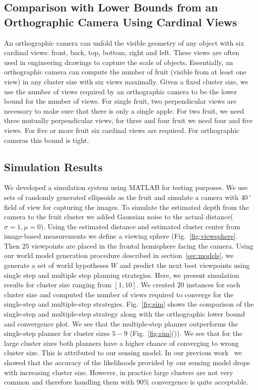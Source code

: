 \subsection{Comparison with Lower Bounds from an Orthographic Camera Using Cardinal Views}\label{subsec:lowerbound}
An orthographic camera can unfold the visible geometry of any object with six cardinal views: front, back, top, bottom, right and left. These views are often used in engineering drawings to capture the scale of objects. Essentially, an orthographic camera can compute the number of fruit (visible from at least one view) in any cluster size with six views maximally. Given a fixed cluster size, we use the number of views required by an orthographic camera to be the lower bound for the number of views. For single fruit, two perpendicular views are necessary to make sure that there is only a single apple. For two fruit, we need three mutually perpendicular views, for three and four fruit we need four and five views. For five or more fruit six cardinal views are required. For orthographic cameras this bound is tight.
\subsection{Simulation Results }\label{subsec:simulation}
We developed a simulation system using MATLAB for testing purposes. We use sets of randomly generated ellipsoids as the fruit and simulate a camera with $40\,^{\circ}$ field of view for capturing the images. To simulate the estimated depth from the camera to the fruit cluster we added Gaussian noise to the actual distance($\sigma = 1, \mu = 0$). Using the estimated distance and estimated cluster center from image-based measurements we define a viewing sphere (Fig.~\ref{fig:viewsphere}. Then $25$ viewpoints are placed in the frontal hemisphere facing the camera. Using our world model generation procedure described in section~\ref{sec:models}, we generate a set of world hypotheses $W$ and predict the next best viewpoints using single step and multiple step planning strategies. Here, we present simulation results for cluster size ranging from $[1,10]$. We created $20$ instances for each cluster size and computed the number of views required to converge for the single-step and multiple-step strategies. Fig.~\ref{fig:sim} shows the comparison of the single-step and multiple-step strategy along with the orthographic lower bound and convergence plot. We see that the multiple-step planner outperforms the single-step planner for cluster sizes $5-9$ (Fig.~\ref{fig:sim}()). We see that for the large cluster sizes both planners have a higher chance of converging to wrong cluster size. This is attributed to our sensing model. In our previous work~\cite{roy2016counting} we showed that the accuracy of the likelihoods provided by our sensing model drops with increasing cluster size. However, in practice large clusters are not very common and therefore handling them with $90\%$ convergence is quite acceptable.


